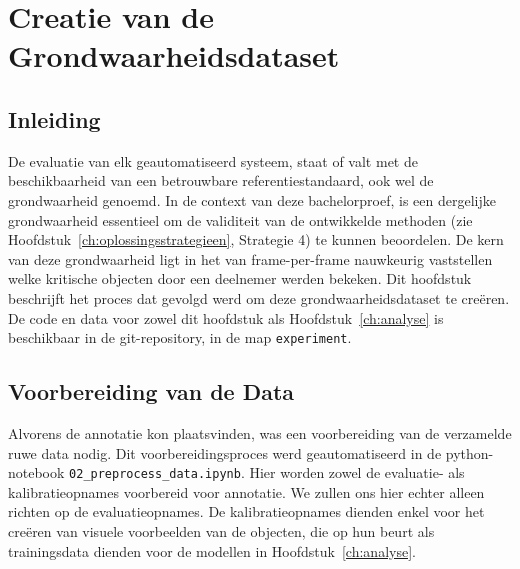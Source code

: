 \chapter{Creatie van de Grondwaarheidsdataset}
\label{ch:grondwaarheid}

\section{Inleiding}

De evaluatie van elk geautomatiseerd systeem, staat of valt met de beschikbaarheid 
van een betrouwbare referentiestandaard, ook wel de grondwaarheid genoemd.
In de context van deze bachelorproef, is een dergelijke grondwaarheid essentieel om de validiteit  
van de ontwikkelde methoden (zie Hoofdstuk~\ref{ch:oplossingsstrategieen}, Strategie 4) te kunnen beoordelen.
De kern van deze grondwaarheid ligt in het van frame-per-frame nauwkeurig vaststellen welke kritische objecten 
door een deelnemer werden bekeken.
Dit hoofdstuk beschrijft het proces dat gevolgd werd om deze grondwaarheidsdataset te creëren.
De code en data voor zowel dit hoofdstuk als Hoofdstuk~\ref{ch:analyse} is beschikbaar in de git-repository,
in de map \texttt{experiment}.

\section{Voorbereiding van de Data}

Alvorens de annotatie kon plaatsvinden, was een voorbereiding van de verzamelde ruwe data nodig.
Dit voorbereidingsproces werd geautomatiseerd in de python-notebook \texttt{02\_preprocess\_data.ipynb}.
Hier worden zowel de evaluatie- als kalibratieopnames voorbereid voor annotatie. 
We zullen ons hier echter alleen richten op de evaluatieopnames.
De kalibratieopnames dienden enkel voor het creëren van visuele voorbeelden van de objecten,
die op hun beurt als trainingsdata dienden voor de modellen in Hoofdstuk~\ref{ch:analyse}.

